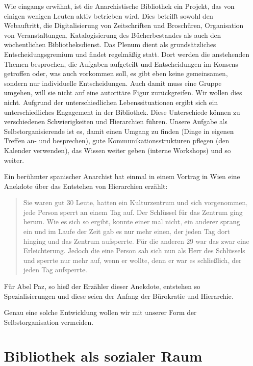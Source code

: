 \documentclass[a4paper,
fontsize=11pt,
oneside,
numbers=noperiodatend,
parskip=half-,
bibliography=totoc,
final
]{scrartcl}
\begin{document}
Wie eingangs erwähnt, ist die Anarchistische Bibliothek ein Projekt, das
von einigen wenigen Leuten aktiv betrieben wird. Dies betrifft sowohl
den Webauftritt, die Digitalisierung von Zeitschriften und Broschüren,
Organisation von Veranstaltungen, Katalogisierung des Bücherbestandes
als auch den wöchentlichen Bibliotheksdienst. Das Plenum dient als
grundsätzliches Entscheidungsgremium und findet regelmäßig statt. Dort
werden die anstehenden Themen besprochen, die Aufgaben aufgeteilt und
Entscheidungen im Konsens getroffen oder, was auch vorkommen soll, es
gibt eben keine gemeinsamen, sondern nur individuelle Entscheidungen.
Auch damit muss eine Gruppe umgehen, will sie nicht auf eine autoritäre
Figur zurückgreifen. Wir wollen dies nicht. Aufgrund der
unterschiedlichen Lebenssituationen ergibt sich ein unterschiedliches
Engagement in der Bibliothek. Diese Unterschiede können zu verschiedenen
Schwierigkeiten und Hierarchien führen. Unsere Aufgabe als
Selbstorganisierende ist es, damit einen Umgang zu finden (Dinge in
eigenen Treffen an- und besprechen), gute Kommunikationsstrukturen
pflegen (den Kalender verwenden), das Wissen weiter geben (interne
Workshops) und so weiter.

Ein berühmter spanischer Anarchist hat einmal in einem Vortrag in Wien
eine Anekdote über das Entstehen von Hierarchien erzählt:

\begin{quote}
Sie waren gut 30 Leute, hatten ein Kulturzentrum und sich vorgenommen,
jede Person sperrt an einem Tag auf. Der Schlüssel für das Zentrum ging
herum. Wie es sich so ergibt, konnte einer mal nicht, ein anderer sprang
ein und im Laufe der Zeit gab es nur mehr einen, der jeden Tag dort
hinging und das Zentrum aufsperrte. Für die anderen 29 war das zwar eine
Erleichterung. Jedoch die eine Person sah sich nun als Herr des
Schlüssels und sperrte nur mehr auf, wenn er wollte, denn er war es
schließlich, der jeden Tag aufsperrte.
\end{quote}

Für Abel Paz, so hieß der Erzähler dieser Anekdote, entstehen so
Spezialisierungen und diese seien der Anfang der Bürokratie und
Hierarchie.

Genau eine solche Entwicklung wollen wir mit unserer Form der
Selbstorganisation vermeiden.

\section*{Bibliothek als sozialer
Raum}\label{bibliothek-als-sozialer-raum}
\end{document}
